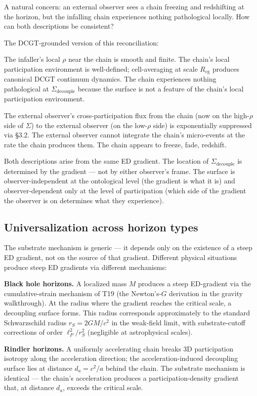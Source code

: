 \documentclass[11pt,a4paper]{article}
\begin{document}
A natural concern: an external observer sees a chain freezing and redshifting at the horizon, but the infalling chain experiences nothing pathological locally. How can both descriptions be consistent?

The DCGT-grounded version of this reconciliation:

The infaller's local $\rho$ near the chain is smooth and finite. The chain's local participation environment is well-defined; cell-averaging at scale $R_{\mathrm{cg}}$ produces canonical DCGT continuum dynamics. The chain experiences nothing pathological at $\Sigma_{\mathrm{decouple}}$ because the surface is not a feature of the chain's local participation environment.

The external observer's cross-participation flux from the chain (now on the high-$\rho$ side of $\Sigma$) to the external observer (on the low-$\rho$ side) is exponentially suppressed via \S3.2. The external observer cannot integrate the chain's micro-events at the rate the chain produces them. The chain appears to freeze, fade, redshift.

Both descriptions arise from the same ED gradient. The location of $\Sigma_{\mathrm{decouple}}$ is determined by the gradient --- not by either observer's frame. The surface is observer-independent at the ontological level (the gradient is what it is) and observer-dependent only at the level of participation (which side of the gradient the observer is on determines what they experience).

\subsection{Universalization across horizon types}

The substrate mechanism is generic --- it depends only on the existence of a steep ED gradient, not on the source of that gradient. Different physical situations produce steep ED gradients via different mechanisms:

\textbf{Black hole horizons.} A localized mass $M$ produces a steep ED-gradient via the cumulative-strain mechanism of T19 (the Newton's-$G$ derivation in the gravity walkthrough). At the radius where the gradient reaches the critical scale, a decoupling surface forms. This radius corresponds approximately to the standard Schwarzschild radius $r_S = 2GM/c^2$ in the weak-field limit, with substrate-cutoff corrections of order $\ell_P^2/r_S^2$ (negligible at astrophysical scales).

\textbf{Rindler horizons.} A uniformly accelerating chain breaks 3D participation isotropy along the acceleration direction; the acceleration-induced decoupling surface lies at distance $d_a = c^2/a$ behind the chain. The substrate mechanism is identical --- the chain's acceleration produces a participation-density gradient that, at distance $d_a$, exceeds the critical scale.
\end{document}
